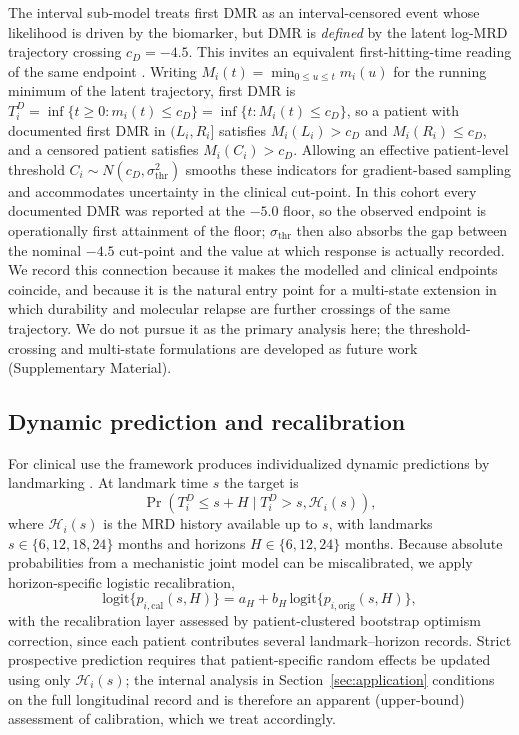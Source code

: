 \documentclass[11pt]{article}
\begin{document}
The interval sub-model treats first DMR as an interval-censored event whose
likelihood is driven by the biomarker, but DMR is \emph{defined} by the
latent log-MRD trajectory crossing $c_D=-4.5$. This invites an equivalent
first-hitting-time reading of the same endpoint
\cite{LeeWhitmore2006ThresholdRegression,AalenGjessing2001ProcessView}.
Writing $M_i(t)=\min_{0\le u\le t}m_i(u)$ for the running minimum of the
latent trajectory, first DMR is
$T_i^D=\inf\{t\ge 0:m_i(t)\le c_D\}=\inf\{t:M_i(t)\le c_D\}$, so a patient
with documented first DMR in $(L_i,R_i]$ satisfies $M_i(L_i)>c_D$ and
$M_i(R_i)\le c_D$, and a censored patient satisfies $M_i(C_i)>c_D$. Allowing
an effective patient-level threshold $C_i\sim N(c_D,\sigma_{\mathrm{thr}}^2)$
smooths these indicators for gradient-based sampling and accommodates
uncertainty in the clinical cut-point. In this cohort every documented DMR was
reported at the $-5.0$ floor, so the observed endpoint is operationally first
attainment of the floor; $\sigma_{\mathrm{thr}}$ then also absorbs the gap
between the nominal $-4.5$ cut-point and the value at which response is
actually recorded. We record this connection because it
makes the modelled and clinical endpoints coincide, and because it is the
natural entry point for a multi-state extension in which durability and
molecular relapse are further crossings of the same trajectory. We do not
pursue it as the primary analysis here; the threshold-crossing and
multi-state formulations are developed as future work (Supplementary
Material).

\subsection{Dynamic prediction and recalibration}
\label{sec:dynamic}

For clinical use the framework produces individualized dynamic predictions by
landmarking \cite{vanHouwelingen2007Landmarking,Rizopoulos2011DynamicPredictions}.
At landmark time $s$ the target is
\[
\Pr(T_i^D\le s+H\mid T_i^D>s,\mathcal H_i(s)),
\]
where $\mathcal H_i(s)$ is the MRD history available up to $s$, with
landmarks $s\in\{6,12,18,24\}$ months and horizons $H\in\{6,12,24\}$
months. Because absolute probabilities from a mechanistic joint model can
be miscalibrated, we apply horizon-specific logistic recalibration,
\[
\mathrm{logit}\{p_{i,\mathrm{cal}}(s,H)\}
=a_H+b_H\,\mathrm{logit}\{p_{i,\mathrm{orig}}(s,H)\},
\]
with the recalibration layer assessed by patient-clustered bootstrap optimism
correction, since each patient contributes several landmark--horizon records.
Strict prospective prediction requires that patient-specific random
effects be updated using only $\mathcal H_i(s)$; the internal analysis in
Section~\ref{sec:application} conditions on the full longitudinal record
and is therefore an apparent (upper-bound) assessment of calibration,
which we treat accordingly.
\end{document}

